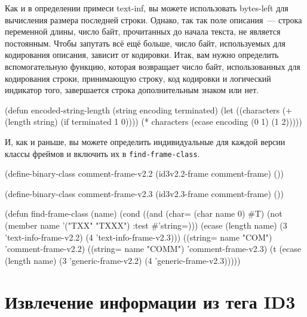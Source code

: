 Как и в определении примеси text-inf, вы можете использовать bytes-left для вычисления
размера последней строки. Однако, так так поле описания~--- строка переменной длины, число
байт, прочитанных до начала текста, не является постоянным. Чтобы запутать всё ещё больше,
число байт, используемых для кодирования описания, зависит от кодировки. Итак, вам нужно
определить вспомогательную функцию, которая возвращает число байт, использованных для
кодирования строки, принимающую строку, код кодировки и логический индикатор того,
завершается строка дополнительным знаком или нет.

\begin{myverb}
(defun encoded-string-length (string encoding terminated)
  (let ((characters (+ (length string) (if terminated 1 0))))
    (* characters (ecase encoding (0 1) (1 2)))))
\end{myverb}

И, как и раньше, вы можете определить индивидуальные для каждой версии классы фреймов и
включить их в \lstinline{find-frame-class}.

\begin{myverb}
(define-binary-class comment-frame-v2.2 (id3v2.2-frame comment-frame) ())

(define-binary-class comment-frame-v2.3 (id3v2.3-frame comment-frame) ())

(defun find-frame-class (name)
  (cond
    ((and (char= (char name 0) #\bslash{}T)
          (not (member name '("TXX" "TXXX") :test #'string=)))
     (ecase (length name)
       (3 'text-info-frame-v2.2)
       (4 'text-info-frame-v2.3)))
    ((string= name "COM")  'comment-frame-v2.2)
    ((string= name "COMM") 'comment-frame-v2.3)
    (t
     (ecase (length name)
       (3 'generic-frame-v2.2)
       (4 'generic-frame-v2.3)))))
\end{myverb}

\section{Извлечение информации из тега ID3}

